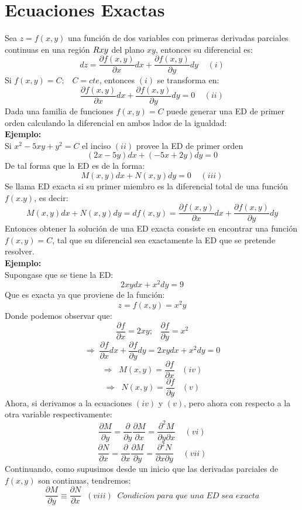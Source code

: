 \documentclass[10pt]{article}
\begin{document}
\section{Ecuaciones Exactas}
Sea $z=f(x,y)$ una función de dos variables con primeras derivadas parciales continuas en una región $R\tiny{xy}$ del plano $xy$, entonces su diferencial es:
\[dz=\frac{\partial{f(x,y)}}{\partial{x}}dx+\frac{\partial{f(x,y)}}{\partial{y}}dy\;\;\;\;(i)\]
Si $f(x,y)=C;\;\;\;C=cte$, entonces $(i)$ se transforma en:
\[\frac{\partial{f(x,y)}}{\partial{x}}dx+\frac{\partial{f(x,y)}}{\partial{y}}dy=0\;\;\;\;(ii)\]
Dada una familia de funciones $f(x,y)=C$ puede generar una ED de primer orden calculando la diferencial en ambos lados de la igualdad:
\\
\textbf{Ejemplo:}
\\
Si $x^{2}-5xy+y^{2}=C$ el inciso $(ii)$ provee la ED de primer orden
\[(2x-5y)dx+(-5x+2y)dy=0\]
De tal forma que la ED es de la forma:
\[M(x,y)dx+N(x,y)dy=0\;\;\;\;(iii)\]
Se llama ED exacta si su primer miembro es la diferencial total de una función $f(x.y)$, es decir:
\[M(x,y)dx+N(x,y)dy=df(x,y)=\frac{\partial{f(x,y)}}{\partial{x}}dx+\frac{\partial{f(x,y)}}{\partial{y}}dy\]
Entonces obtener la solución de una ED exacta consiste en encontrar una función $f(x,y)=C$, tal que su diferencial sea exactamente la ED que se pretende resolver.
\\
\textbf{Ejemplo:}
\\
Supongase que se tiene la ED:
\[2xydx+x^{2}dy=9\]
Que es exacta ya que proviene de la función:
\[z=f(x,y)=x^{2}y\]
Donde podemos observar que:
\[\frac{\partial{f}}{\partial{x}}=2xy;\;\;\;\frac{\partial{f}}{\partial{y}}=x^{2}\]
\[\Rightarrow\;\frac{\partial{f}}{\partial{x}}dx+\frac{\partial{f}}{\partial{y}}dy=2xydx+x^{2}dy=0\]
\[\Rightarrow\;\;M(x,y)=\frac{\partial{f}}{\partial{x}}\;\;\;(iv)\]
\[\Rightarrow\;\;N(x,y)=\frac{\partial{f}}{\partial{y}}\;\;\;(v)\]
Ahora, si derivamos a la ecuaciones $(iv)$ y $(v)$, pero ahora con respecto a la otra variable respectivamente:
\[\frac{\partial{M}}{\partial{y}}=\frac{\partial}{\partial{y}}\frac{\partial{M}}{\partial{x}}=\frac{\partial^{2}{M}}{\partial{y}\partial{x}}\;\;\;\;(vi)\]
\[\frac{\partial{N}}{\partial{x}}=\frac{\partial}{\partial{x}}\frac{\partial{M}}{\partial{y}}=\frac{\partial^{2}{N}}{\partial{x}\partial{y}}\;\;\;\;(vii)\]
Continuando, como supusimos desde un inicio que las derivadas parciales de $f(x,y)$ son continuas, tendremos:
\[\frac{\partial{M}}{\partial{y}}\equiv \frac{\partial{N}}{\partial{x}}\;\;(viii)\;\;Condici\acute{o}n\;para\;que\;una\;ED\;sea\;exacta\]
\end{document}
